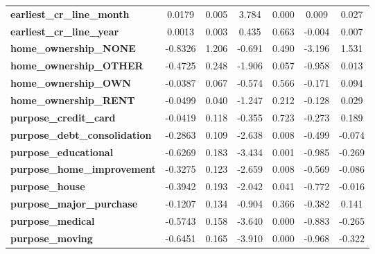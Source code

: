 \begin{center}
\begin{tabular}{lcccccc}
\textbf{earliest\_cr\_line\_month}             &       0.0179  &        0.005     &     3.784  &         0.000        &        0.009    &        0.027     \\
\textbf{earliest\_cr\_line\_year}              &       0.0013  &        0.003     &     0.435  &         0.663        &       -0.004    &        0.007     \\
\textbf{home\_ownership\_NONE}                 &      -0.8326  &        1.206     &    -0.691  &         0.490        &       -3.196    &        1.531     \\
\textbf{home\_ownership\_OTHER}                &      -0.4725  &        0.248     &    -1.906  &         0.057        &       -0.958    &        0.013     \\
\textbf{home\_ownership\_OWN}                  &      -0.0387  &        0.067     &    -0.574  &         0.566        &       -0.171    &        0.094     \\
\textbf{home\_ownership\_RENT}                 &      -0.0499  &        0.040     &    -1.247  &         0.212        &       -0.128    &        0.029     \\
\textbf{purpose\_credit\_card}                 &      -0.0419  &        0.118     &    -0.355  &         0.723        &       -0.273    &        0.189     \\
\textbf{purpose\_debt\_consolidation}          &      -0.2863  &        0.109     &    -2.638  &         0.008        &       -0.499    &       -0.074     \\
\textbf{purpose\_educational}                  &      -0.6269  &        0.183     &    -3.434  &         0.001        &       -0.985    &       -0.269     \\
\textbf{purpose\_home\_improvement}            &      -0.3275  &        0.123     &    -2.659  &         0.008        &       -0.569    &       -0.086     \\
\textbf{purpose\_house}                        &      -0.3942  &        0.193     &    -2.042  &         0.041        &       -0.772    &       -0.016     \\
\textbf{purpose\_major\_purchase}              &      -0.1207  &        0.134     &    -0.904  &         0.366        &       -0.382    &        0.141     \\
\textbf{purpose\_medical}                      &      -0.5743  &        0.158     &    -3.640  &         0.000        &       -0.883    &       -0.265     \\
\textbf{purpose\_moving}                       &      -0.6451  &        0.165     &    -3.910  &         0.000        &       -0.968    &       -0.322     \\

\end{tabular}
\end{center}
